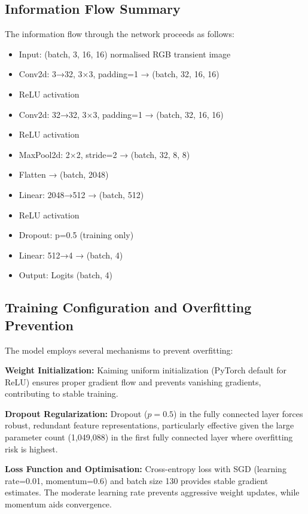 \documentclass[12pt,a4paper,oneside]{report}
\begin{document}
\subsection{Information Flow Summary}

The information flow through the network proceeds as follows:
\begin{itemize}
    \item Input: (batch, 3, 16, 16) normalised RGB transient image
    \item Conv2d: 3→32, 3×3, padding=1 → (batch, 32, 16, 16)
    \item ReLU activation
    \item Conv2d: 32→32, 3×3, padding=1 → (batch, 32, 16, 16)
    \item ReLU activation
    \item MaxPool2d: 2×2, stride=2 → (batch, 32, 8, 8)
    \item Flatten → (batch, 2048)
    \item Linear: 2048→512 → (batch, 512)
    \item ReLU activation
    \item Dropout: p=0.5 (training only)
    \item Linear: 512→4 → (batch, 4)
    \item Output: Logits (batch, 4)
\end{itemize}

\subsection{Training Configuration and Overfitting Prevention}

The model employs several mechanisms to prevent overfitting:

\textbf{Weight Initialization:} Kaiming uniform initialization (PyTorch default for ReLU) ensures proper gradient flow and prevents vanishing gradients, contributing to stable training.

\textbf{Dropout Regularization:} Dropout ($p=0.5$) in the fully connected layer forces robust, redundant feature representations, particularly effective given the large parameter count (1,049,088) in the first fully connected layer where overfitting risk is highest.

\textbf{Loss Function and Optimisation:} Cross-entropy loss with SGD (learning rate=0.01, momentum=0.6) and batch size 130 provides stable gradient estimates. The moderate learning rate prevents aggressive weight updates, while momentum aids convergence.
\end{document}
